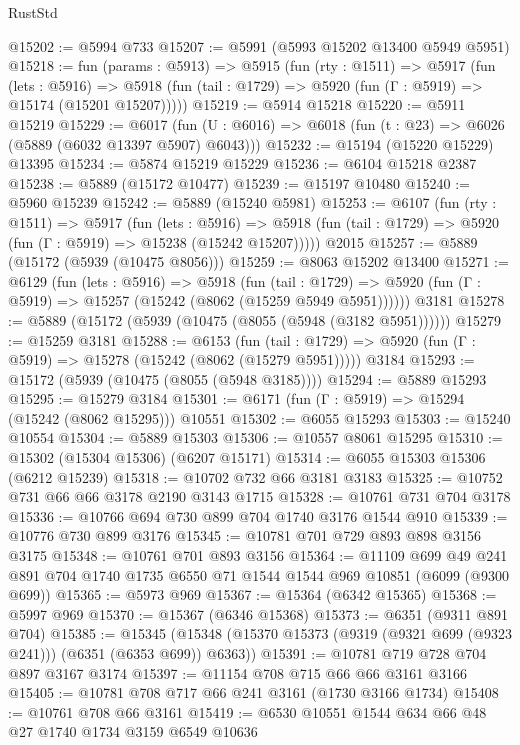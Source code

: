 \begin{lexlean}{RustStd}
\begin{coremodule}
@15202 := @5994 @733
@15207 := @5991 (@5993 @15202 @13400 @5949 @5951)
@15218 := fun (params : @5913) =>
  @5915
    (fun (rty : @1511) =>
    @5917
      (fun (lets : @5916) =>
      @5918 (fun (tail : @1729) => @5920 (fun (Γ : @5919) => @15174 (@15201 @15207)))))
@15219 := @5914 @15218
@15220 := @5911 @15219
@15229 := @6017
    (fun (U : @6016) => @6018 (fun (t : @23) => @6026 (@5889 (@6032 @13397 @5907) @6043)))
@15232 := @15194 (@15220 @15229) @13395
@15234 := @5874 @15219 @15229
@15236 := @6104 @15218 @2387
@15238 := @5889 (@15172 @10477)
@15239 := @15197 @10480
@15240 := @5960 @15239
@15242 := @5889 (@15240 @5981)
@15253 := @6107
    (fun (rty : @1511) =>
    @5917
      (fun (lets : @5916) =>
      @5918 (fun (tail : @1729) => @5920 (fun (Γ : @5919) => @15238 (@15242 @15207)))))
    @2015
@15257 := @5889 (@15172 (@5939 (@10475 @8056)))
@15259 := @8063 @15202 @13400
@15271 := @6129
    (fun (lets : @5916) =>
    @5918
      (fun (tail : @1729) =>
      @5920 (fun (Γ : @5919) => @15257 (@15242 (@8062 (@15259 @5949 @5951))))))
    @3181
@15278 := @5889 (@15172 (@5939 (@10475 (@8055 (@5948 (@3182 @5951))))))
@15279 := @15259 @3181
@15288 := @6153
    (fun (tail : @1729) => @5920 (fun (Γ : @5919) => @15278 (@15242 (@8062 (@15279 @5951)))))
    @3184
@15293 := @15172 (@5939 (@10475 (@8055 (@5948 @3185))))
@15294 := @5889 @15293
@15295 := @15279 @3184
@15301 := @6171 (fun (Γ : @5919) => @15294 (@15242 (@8062 @15295))) @10551
@15302 := @6055 @15293
@15303 := @15240 @10554
@15304 := @5889 @15303
@15306 := @10557 @8061 @15295
@15310 := @15302 (@15304 @15306) (@6207 @15171)
@15314 := @6055 @15303 @15306 (@6212 @15239)
@15318 := @10702 @732 @66 @3181 @3183
@15325 := @10752 @731 @66 @66 @3178 @2190 @3143 @1715
@15328 := @10761 @731 @704 @3178
@15336 := @10766 @694 @730 @899 @704 @1740 @3176 @1544 @910
@15339 := @10776 @730 @899 @3176
@15345 := @10781 @701 @729 @893 @898 @3156 @3175
@15348 := @10761 @701 @893 @3156
@15364 := @11109
    @699
    @49
    @241
    @891
    @704
    @1740
    @1735
    @6550
    @71
    @1544
    @1544
    @969
    @10851
    (@6099 (@9300 @699))
@15365 := @5973 @969
@15367 := @15364 (@6342 @15365)
@15368 := @5997 @969
@15370 := @15367 (@6346 @15368)
@15373 := @6351 (@9311 @891 @704)
@15385 := @15345
    (@15348 (@15370 @15373 (@9319 (@9321 @699 (@9323 @241))) (@6351 (@6353 @699)) @6363))
@15391 := @10781 @719 @728 @704 @897 @3167 @3174
@15397 := @11154 @708 @715 @66 @66 @3161 @3166
@15405 := @10781 @708 @717 @66 @241 @3161 (@1730 @3166 @1734)
@15408 := @10761 @708 @66 @3161
@15419 := @6530 @10551 @1544 @634 @66 @48 @27 @1740 @1734 @3159 @6549 @10636

\end{coremodule}
\end{lexlean}
